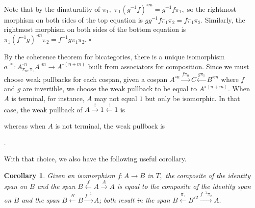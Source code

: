 \documentclass[12pt,twoside,openright]{report}
\newcommand{\maps}{\colon}
\newtheorem{cor}[thm]{Corollary}
\begin{document}
Note that by the dinaturality of $\pi_1,$ $\pi_1 (g^{-1}f)^{\circ m} = g^{-1}f \pi_1,$ so the rightmost morphism on both sides of the top equation is $g g^{-1}f \pi_1 \pi_2 = f \pi_1\pi_2.$  Similarly, the rightmost morphism on both sides of the bottom equation is $\pi_1 (f^{-1}g)^{\circ m} \pi_2 = f^{-1}g \pi_1 \pi_2.$ \hfill $\square$

By the coherence theorem for bicategories, there is a unique isomorphism $a^{\circ *}\maps A^{\circ n}_{\pi_n,\pi_1}A^{\circ m} \to A^{\circ (n+m)}$ built from associators for composition.  Since we must choose weak pullbacks for each cospan, given a cospan $A^{\circ n} \stackrel{f\pi_n}{\to} C \stackrel{g\pi_1}{\leftarrow} B^{\circ m}$ where $f$ and $g$ are invertible, we choose the weak pullback to be equal to $A^{\circ (n+m)}.$  When $A$ is terminal, for instance, $A$ may not equal $1$ but only be isomorphic.  In that case, the weak pullback of $A \stackrel{!}{\to} 1 \stackrel{!}{\leftarrow} 1$ is
\begin{center}
\end{center}
whereas when $A$ is not terminal, the weak pullback is
\begin{center}
  .
\end{center}

With that choice, we also have the following useful corollary.
\begin{cor}
  \label{reverse}
  Given an isomorphism $f\maps A \to B$ in $T,$ the composite of the identity span on $B$ and the span $B \stackrel{f}{\leftarrow} A \stackrel{A}{\to} A$ is equal to the composite of the identity span on $B$ and the span $B \stackrel{B}{\leftarrow} B \stackrel{f^{-1}}{\to} A$; both result in the span $B \stackrel{\pi_1}{\leftarrow} B^{\circ 2} \stackrel{f^{-1}\pi_2}{\to} A.$
\end{cor}
\end{document}

